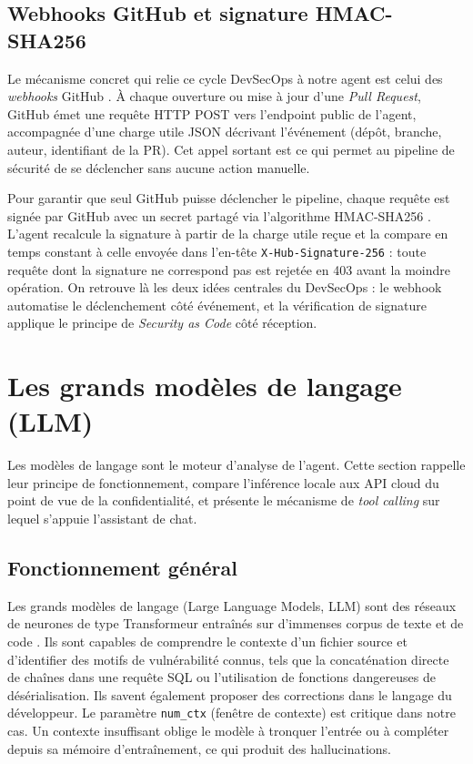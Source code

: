     \subsection{Webhooks GitHub et signature HMAC-SHA256}

        Le mécanisme concret qui relie ce cycle DevSecOps à notre agent est celui des
        \textit{webhooks} GitHub \cite{GitHubWebhooks}. À chaque ouverture ou mise à jour
        d'une \textit{Pull Request}, GitHub émet une requête HTTP POST vers l'endpoint
        public de l'agent, accompagnée d'une charge utile JSON décrivant l'événement
        (dépôt, branche, auteur, identifiant de la PR). Cet appel sortant est ce qui
        permet au pipeline de sécurité de se déclencher sans aucune action manuelle.

        Pour garantir que seul GitHub puisse déclencher le pipeline, chaque requête est
        signée par GitHub avec un secret partagé via l'algorithme HMAC-SHA256 \cite{HMAC}.
        L'agent recalcule la signature à partir de la charge utile reçue et la compare en
        temps constant à celle envoyée dans l'en-tête \texttt{X-Hub-Signature-256} : toute
        requête dont la signature ne correspond pas est rejetée en 403 avant la moindre
        opération. On retrouve là les deux idées centrales du DevSecOps : le webhook
        automatise le déclenchement côté événement, et la vérification de signature
        applique le principe de \textit{Security as Code} côté réception.

\section{Les grands modèles de langage (LLM)}

    Les modèles de langage sont le moteur d'analyse de l'agent. Cette section rappelle leur
    principe de fonctionnement, compare l'inférence locale aux API cloud du point de vue de
    la confidentialité, et présente le mécanisme de \textit{tool calling} sur lequel
    s'appuie l'assistant de chat.

    \subsection{Fonctionnement général}

        Les grands modèles de langage (Large Language Models, LLM) sont des réseaux de
        neurones de type Transformeur entraînés sur d'immenses corpus de texte et de code
        \cite{QwenCoder}.
        Ils sont capables de comprendre le contexte d'un fichier source et d'identifier
        des motifs de vulnérabilité connus, tels que la concaténation directe de
        chaînes dans une requête SQL ou l'utilisation de fonctions dangereuses de
        désérialisation. Ils savent également proposer des corrections dans le langage
        du développeur. Le paramètre \texttt{num\_ctx} (fenêtre de contexte) est
        critique dans notre cas. Un contexte insuffisant oblige le modèle à tronquer
        l'entrée ou à compléter depuis sa mémoire d'entraînement, ce qui produit des
        hallucinations.

